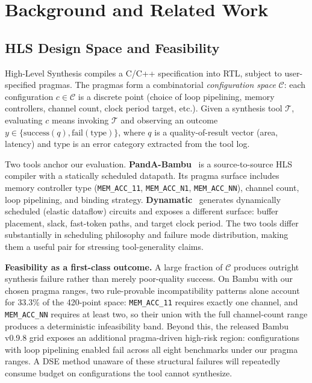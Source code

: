 \documentclass[journal]{IEEEtran}
\begin{document}
\section{Background and Related Work}
\label{sec:related}

\subsection{HLS Design Space and Feasibility}
\label{sec:background}

High-Level Synthesis compiles a C/C++ specification into RTL, subject to user-specified pragmas. The pragmas form a combinatorial \emph{configuration space} $\mathcal{C}$: each configuration $c \in \mathcal{C}$ is a discrete point (choice of loop pipelining, memory controllers, channel count, clock period target, etc.). Given a synthesis tool $\mathcal{T}$, evaluating $c$ means invoking $\mathcal{T}$ and observing an outcome $y \in \{\text{success}(q), \text{fail}(\text{type})\}$, where $q$ is a quality-of-result vector (area, latency) and $\text{type}$ is an error category extracted from the tool log.

Two tools anchor our evaluation. \textbf{PandA-Bambu}~\cite{pilato2013bambu} is a source-to-source HLS compiler with a statically scheduled datapath. Its pragma surface includes memory controller type (\texttt{MEM\_ACC\_11}, \texttt{MEM\_ACC\_N1}, \texttt{MEM\_ACC\_NN}), channel count, loop pipelining, and binding strategy. \textbf{Dynamatic}~\cite{josipovic2018dynamically} generates dynamically scheduled (elastic dataflow) circuits and exposes a different surface: buffer placement, slack, fast-token paths, and target clock period. The two tools differ substantially in scheduling philosophy and failure mode distribution, making them a useful pair for stressing tool-generality claims.

\textbf{Feasibility as a first-class outcome.} A large fraction of $\mathcal{C}$ produces outright synthesis failure rather than merely poor-quality success. On Bambu with our chosen pragma ranges, two rule-provable incompatibility patterns alone account for 33.3\% of the 420-point space: \texttt{MEM\_ACC\_11} requires exactly one channel, and \texttt{MEM\_ACC\_NN} requires at least two, so their union with the full channel-count range produces a deterministic infeasibility band. Beyond this, the released Bambu v0.9.8 grid exposes an additional pragma-driven high-risk region: configurations with loop pipelining enabled fail across all eight benchmarks under our pragma ranges. A DSE method unaware of these structural failures will repeatedly consume budget on configurations the tool cannot synthesize.
\end{document}
